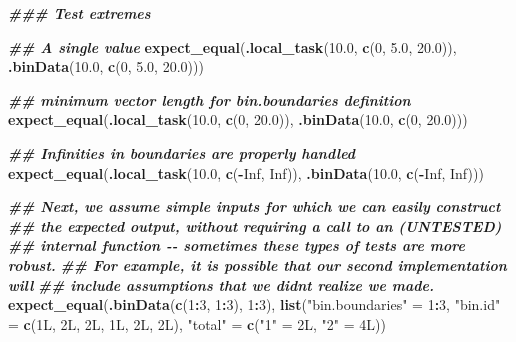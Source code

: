 \documentclass[
]{book}
\newenvironment{Shaded}{\begin{snugshade}}{\end{snugshade}}
\newcommand{\ConstantTok}[1]{\textcolor[rgb]{0.56,0.35,0.01}{#1}}
\newcommand{\DecValTok}[1]{\textcolor[rgb]{0.00,0.00,0.81}{#1}}
\newcommand{\DocumentationTok}[1]{\textcolor[rgb]{0.56,0.35,0.01}{\textbf{\textit{#1}}}}
\newcommand{\FloatTok}[1]{\textcolor[rgb]{0.00,0.00,0.81}{#1}}
\newcommand{\FunctionTok}[1]{\textcolor[rgb]{0.13,0.29,0.53}{\textbf{#1}}}
\newcommand{\NormalTok}[1]{#1}
\newcommand{\OtherTok}[1]{\textcolor[rgb]{0.56,0.35,0.01}{#1}}
\newcommand{\SpecialCharTok}[1]{\textcolor[rgb]{0.81,0.36,0.00}{\textbf{#1}}}
\newcommand{\StringTok}[1]{\textcolor[rgb]{0.31,0.60,0.02}{#1}}
\begin{document}
\begin{Shaded}
\begin{Highlighting}[]
  \DocumentationTok{\#\#\# Test extremes}
  
  \DocumentationTok{\#\# A single \textasciigrave{}value\textasciigrave{}}
  \FunctionTok{expect\_equal}\NormalTok{(}\FunctionTok{.local\_task}\NormalTok{(}\FloatTok{10.0}\NormalTok{, }\FunctionTok{c}\NormalTok{(}\DecValTok{0}\NormalTok{, }\FloatTok{5.0}\NormalTok{, }\FloatTok{20.0}\NormalTok{)),}
               \FunctionTok{.binData}\NormalTok{(}\FloatTok{10.0}\NormalTok{, }\FunctionTok{c}\NormalTok{(}\DecValTok{0}\NormalTok{, }\FloatTok{5.0}\NormalTok{, }\FloatTok{20.0}\NormalTok{)))}
  
  \DocumentationTok{\#\# minimum vector length for \textasciigrave{}bin.boundaries\textasciigrave{} definition}
  \FunctionTok{expect\_equal}\NormalTok{(}\FunctionTok{.local\_task}\NormalTok{(}\FloatTok{10.0}\NormalTok{, }\FunctionTok{c}\NormalTok{(}\DecValTok{0}\NormalTok{, }\FloatTok{20.0}\NormalTok{)),}
               \FunctionTok{.binData}\NormalTok{(}\FloatTok{10.0}\NormalTok{, }\FunctionTok{c}\NormalTok{(}\DecValTok{0}\NormalTok{, }\FloatTok{20.0}\NormalTok{)))}
  
  \DocumentationTok{\#\# Infinities in boundaries are properly handled}
  \FunctionTok{expect\_equal}\NormalTok{(}\FunctionTok{.local\_task}\NormalTok{(}\FloatTok{10.0}\NormalTok{, }\FunctionTok{c}\NormalTok{(}\SpecialCharTok{{-}}\ConstantTok{Inf}\NormalTok{, }\ConstantTok{Inf}\NormalTok{)),}
               \FunctionTok{.binData}\NormalTok{(}\FloatTok{10.0}\NormalTok{, }\FunctionTok{c}\NormalTok{(}\SpecialCharTok{{-}}\ConstantTok{Inf}\NormalTok{, }\ConstantTok{Inf}\NormalTok{)))}
  
  \DocumentationTok{\#\# Next, we assume simple inputs for which we can easily construct}
  \DocumentationTok{\#\#  the expected output, without requiring a call to an (UNTESTED)}
  \DocumentationTok{\#\#  internal function {-}{-} sometimes these types of tests are more robust.}
  \DocumentationTok{\#\#  For example, it is possible that our second implementation will }
  \DocumentationTok{\#\#  include assumptions that we didn\textquotesingle{}t realize we made.}
  \FunctionTok{expect\_equal}\NormalTok{(}\FunctionTok{.binData}\NormalTok{(}\FunctionTok{c}\NormalTok{(}\DecValTok{1}\SpecialCharTok{:}\DecValTok{3}\NormalTok{, }\DecValTok{1}\SpecialCharTok{:}\DecValTok{3}\NormalTok{), }\DecValTok{1}\SpecialCharTok{:}\DecValTok{3}\NormalTok{),}
               \FunctionTok{list}\NormalTok{(}\StringTok{"bin.boundaries"} \OtherTok{=} \DecValTok{1}\SpecialCharTok{:}\DecValTok{3}\NormalTok{,}
                    \StringTok{"bin.id"}         \OtherTok{=} \FunctionTok{c}\NormalTok{(1L, 2L, 2L, 1L, 2L, 2L),}
                    \StringTok{"total"}          \OtherTok{=} \FunctionTok{c}\NormalTok{(}\StringTok{"1"} \OtherTok{=}\NormalTok{ 2L, }\StringTok{"2"} \OtherTok{=}\NormalTok{ 4L))}
               

\end{Highlighting}
\end{Shaded}
\end{document}
